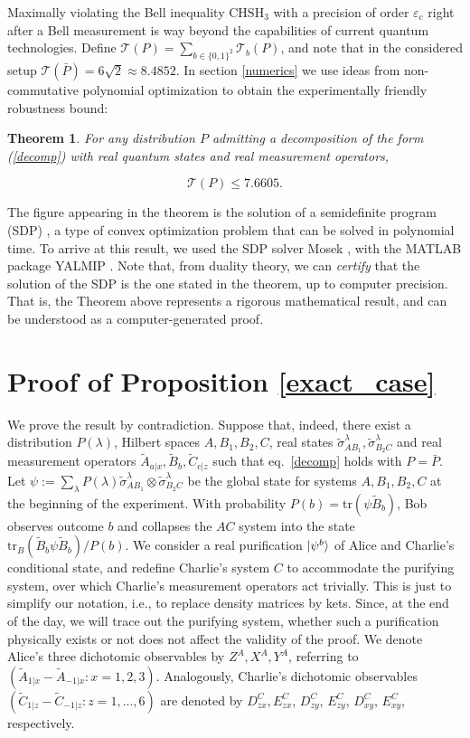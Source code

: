 \documentclass[onecolumn,prx,amsmath,amssymb,12pt]{revtex4-2}
\def\be{\begin{equation}}
\def\ee{\end{equation}}
\def\tr{\mbox{tr}}
\newtheorem{theo}{Theorem}
\begin{document}
\begin{appendix}
Maximally violating the Bell inequality $\text{CHSH}_3$ with a precision of order $\varepsilon_c$ right after a Bell measurement is way beyond the capabilities of current quantum technologies. Define $\mathscr{T}(P)=\sum_{b\in\{0,1\}^2}\mathscr{T}_b(P)$, and note that in the considered setup $\mathscr{T}(\bar{P})=6\sqrt{2}\approx 8.4852$. 
In section \ref{numerics} we use ideas from non-commutative polynomial optimization \cite{NOP} to obtain the experimentally friendly robustness bound:


\begin{theo}
\label{main_theo}
For any distribution $P$ admitting a decomposition of the form (\ref{decomp}) with real quantum states and real measurement operators, 

\be
\mathscr{T}(P)\leq 7.6605.
\label{violation}
\ee
\end{theo}

\noindent The figure appearing in the theorem is the solution of a semidefinite program (SDP) \cite{sdp}, a type of convex optimization problem that can be solved in polynomial time. To arrive at this result, we used the SDP solver Mosek \cite{mosek}, with the MATLAB package YALMIP \cite{yalmip}. Note that, from duality theory, we can \emph{certify} that the solution of the SDP is the one stated in the theorem, up to computer precision. That is, the Theorem above represents a rigorous mathematical result, and can be understood as a computer-generated proof.


\section{Proof of Proposition \ref{exact_case}} \label{sec:pbar}
We prove the result by contradiction. Suppose that, indeed, there exist a distribution $P(\lambda)$, Hilbert spaces $A,B_1,B_2,C$, real states $\tilde{\sigma}_{AB_1}^\lambda,\tilde{\sigma}_{B_2C}^\lambda$ and real measurement operators $\tilde{A}_{a|x}, \tilde{B}_{b}, \tilde{C}_{c|z}$ such that eq.~\eqref{decomp} holds with $P=\bar{P}$. Let $\psi:=\sum_\lambda P(\lambda)\tilde{\sigma}^{\lambda}_{AB_1}\otimes\tilde{\sigma}^{\lambda}_{B_2C}$ be the global state for systems $A, B_1, B_2, C$ at the beginning of the experiment. With probability $P(b)=\tr(\psi \tilde{B}_b)$, Bob observes outcome $b$ and collapses the $AC$ system into the state $\tr_{B}(\tilde{B}_b \psi \tilde{B}_b)/P(b)$. We consider a real purification $|\psi^b\rangle$ of Alice and Charlie's conditional state, and redefine Charlie's system $C$ to accommodate the purifying system, over which Charlie's measurement operators act trivially. This is just to simplify our notation, i.e., to replace density matrices by kets. Since, at the end of the day, we will trace out the purifying system, whether such a purification physically exists or not does not affect the validity of the proof. We denote Alice's three dichotomic observables by $Z^A, X^A, Y^A$, referring to $(\tilde{A}_{1|x}-\tilde{A}_{-1|x}:x=1,2,3)$. Analogously, Charlie's dichotomic observables $(\tilde{C}_{1|z}-\tilde{C}_{-1|z}:z=1,...,6)$ are denoted by $D^C_{zx}, E^C_{zx}$, $D^C_{zy}$, $E^C_{zy}$, $D^C_{xy}$, $E^C_{xy}$, respectively.


\end{appendix}
\end{document}
